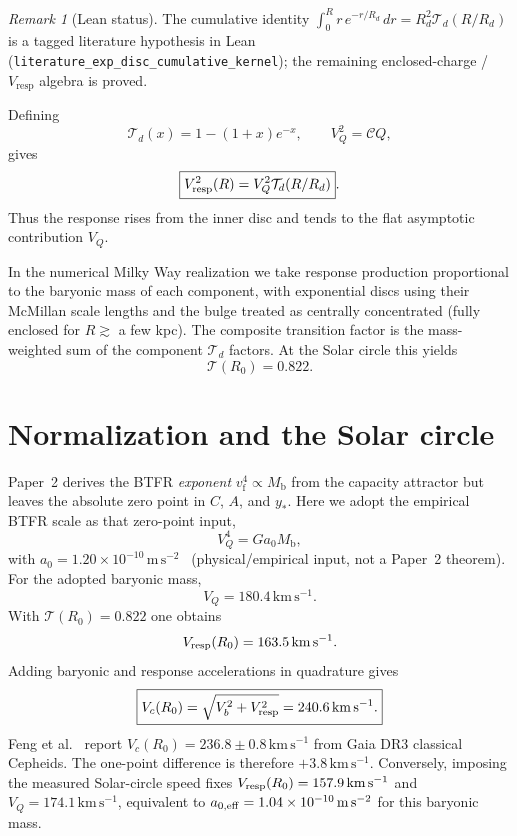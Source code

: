 \documentclass[11pt]{article}
\theoremstyle{definition}
\theoremstyle{remark}
\newtheorem{remark}[theorem]{Remark}
\newcommand{\kms}{\mathrm{km\,s^{-1}}}
\newcommand{\Mb}{M_{\mathrm{b}}}
\begin{document}
\begin{remark}[Lean status]
The cumulative identity $\int_0^R r\,e^{-r/R_d}\,dr=R_d^2\mathcal T_d(R/R_d)$ is a tagged literature hypothesis in Lean (\texttt{literature\_exp\_disc\_cumulative\_kernel}); the remaining enclosed-charge / $V_{\mathrm{resp}}$ algebra is proved.
\end{remark}
Defining
\begin{equation}
\mathcal T_d(x)=1-(1+x)e^{-x},\qquad V_Q^2=\mathcal C Q,
\end{equation}
gives
\begin{equation}
\label{eq:Vresp-exp}
\boxed{V_{\rm resp}^2(R)=V_Q^2\mathcal T_d(R/R_d)}.
\end{equation}
Thus the response rises from the inner disc and tends to the flat asymptotic contribution $V_Q$.

In the numerical Milky Way realization we take response production proportional to the baryonic mass of each component, with exponential discs using their McMillan scale lengths and the bulge treated as centrally concentrated (fully enclosed for $R\gtrsim$ a few kpc).
The composite transition factor is the mass-weighted sum of the component $\mathcal T_d$ factors.
At the Solar circle this yields
\begin{equation}
\mathcal T(R_0)=0.822.
\end{equation}

\section{Normalization and the Solar circle}
\label{sec:solar}
Paper~2 derives the BTFR \emph{exponent} $v_{\mathrm{f}}^{4}\propto\Mb$ from the capacity attractor but leaves the absolute zero point in $C$, $A$, and $y_{\ast}$.
Here we adopt the empirical BTFR scale as that zero-point input,
\begin{equation}
V_Q^4=Ga_0\Mb,
\end{equation}
with $a_0=1.20\times10^{-10}\,\mathrm{m\,s^{-2}}$~\cite{mcgaugh2012,lelli2016} (physical/empirical input, not a Paper~2 theorem).
For the adopted baryonic mass,
\begin{equation}
V_Q=180.4\,\kms.
\end{equation}
With $\mathcal T(R_0)=0.822$ one obtains
\begin{equation}
V_{\rm resp}(R_0)=163.5\,\kms.
\end{equation}
Adding baryonic and response accelerations in quadrature gives
\begin{equation}
\label{eq:VcR0}
\boxed{V_c(R_0)=\sqrt{V_b^2+V_{\rm resp}^2}=240.6\,\kms.}
\end{equation}
Feng et al.~\cite{Feng2026} report $V_c(R_0)=236.8\pm0.8\,\kms$ from Gaia DR3 classical Cepheids.
The one-point difference is therefore $+3.8\,\kms$.
Conversely, imposing the measured Solar-circle speed fixes $V_{\rm resp}(R_0)=157.9\,\kms$ and $V_Q=174.1\,\kms$, equivalent to $a_{0,\rm eff}=1.04\times10^{-10}\,\mathrm{m\,s^{-2}}$ for this baryonic mass.
\end{document}
